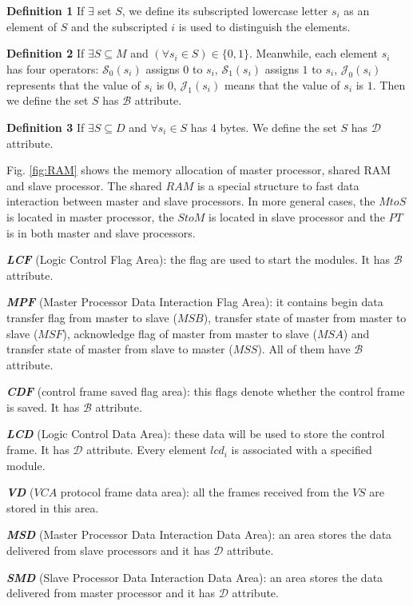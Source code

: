 \documentclass[journal,UTF8]{IEEEtran}
\begin{document}
\textbf{Definition 1} If $\exists$ set $S$, we define its subscripted lowercase letter $s_i$ as an element of $S$ and the subscripted $i$ is used to distinguish the elements.

\textbf{Definition 2} If $\exists S \subseteq M$ and $(\forall s_{i} \in S) \in \{0, 1\} $. Meanwhile, each element $s_i$ has four operators: $\mathcal{S}_0(s_i)$ assigns $0$ to $s_i$, $\mathcal{S}_1(s_i)$ assigns $1$ to $s_i$, $\mathcal{J}_0(s_i)$ represents that the value of $s_i$ is $0$, $\mathcal{J}_1(s_i)$ means that the value of $s_i$ is $1$. Then we define the set $S$ has $\mathcal{B}$ attribute.

\textbf{Definition 3} If $\exists S \subseteq D$ and $\forall s_{i} \in S$ has 4 bytes. We define the set $S$ has $\mathcal{D}$ attribute.

Fig. \ref{fig:RAM} shows the memory allocation of master processor, shared RAM and slave processor. The shared $RAM$ is a special structure to fast data interaction between master and slave processors. In more general cases, the $MtoS$ is located in master processor, the $StoM$ is located in slave processor and the $PT$ is in both master and slave processors. 

\textbf{\emph{LCF}} (Logic Control Flag Area): the flag are used to start the modules. It has $\mathcal{B}$ attribute.

\textbf{\emph{MPF}} (Master Processor Data Interaction Flag Area): it contains begin data transfer flag from master to slave ($MSB$), transfer state of master from master to slave ($MSF$), acknowledge flag of master from master to slave ($MSA$) and transfer state of master from slave to master ($MSS$). All of them have $\mathcal{B}$ attribute.


\textbf{\emph{CDF}} (control frame saved flag area): this flags denote whether the control frame is saved. It has $\mathcal{B}$ attribute.

\textbf{\emph{LCD}} (Logic Control Data Area): these data will be used to store the control frame. It has $\mathcal{D}$ attribute. Every element $lcd_i$ is associated with a specified module.

\textbf{\emph{VD}} ($VCA$ protocol frame data area): all the frames received from the $VS$ are stored in this area.

\textbf{\emph{MSD}} (Master Processor Data Interaction Data Area): an area stores the data delivered from slave processors and it has $\mathcal{D}$ attribute.

\textbf{\emph{SMD}} (Slave Processor Data Interaction Data Area): an area stores the data delivered from master processor and it has $\mathcal{D}$ attribute.
\end{document}
